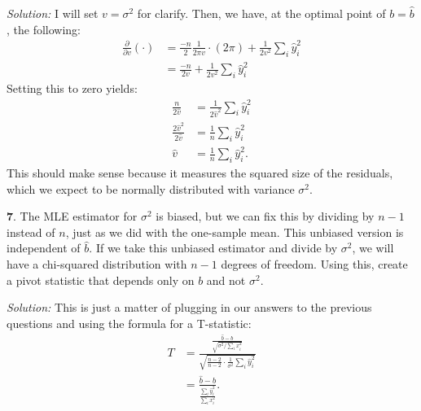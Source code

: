 \documentclass{tufte-handout}
\begin{document}
\textit{Solution:} I will set $v = \sigma^2$ for clarify. Then, we have, at the optimal point of
$b = \widehat{b}$, the following:
\begin{align*}
\frac{\partial}{\partial v} (\cdot) &= \frac{-n}{2} \frac{1}{2\pi v} \cdot (2\pi) + \frac{1}{2v^2} \sum_i \widehat{y}_i^2 \\
&= \frac{-n}{2v} + \frac{1}{2v^2} \sum_i \widehat{y}_i^2
\end{align*}
Setting this to zero yields:
\begin{align*}
\frac{n}{2\widehat{v}} &= \frac{1}{2\widehat{v}^2} \sum_i \widehat{y}_i^2 \\
\frac{2\widehat{v}^2}{2\widehat{v}} &= \frac{1}{n} \sum_i \widehat{y}_i^2 \\
\widehat{v} &= \frac{1}{n} \sum_i \widehat{y}_i^2.
\end{align*}
This should make sense because it measures the squared size of the residuals,
which we expect to be normally distributed with variance $\sigma^2$.

\textbf{7}. The MLE estimator for $\sigma^2$ is biased, but we can fix this by dividing by
$n-1$ instead of $n$, just as we did with the one-sample mean. This unbiased
version is independent of $\widehat{b}$. If we take this unbiased estimator and
divide by $\sigma^2$, we will have a chi-squared distribution with $n-1$ degrees
of freedom. Using this, create a pivot statistic that depends only on $b$ and not
$\sigma^2$.

\textit{Solution:} This is just a matter of plugging in our answers to the previous questions and
using the formula for a T-statistic:
\begin{align*}
T &= \frac{\frac{\widehat{b} - b}{\sqrt{\sigma^2 / \sum_i x_i^2}}}{
  \sqrt{ \frac{n-2}{n-2} \cdot \frac{1}{\sigma^2} \sum_i \widehat{y}_i^2 }
} \\
&=
\frac{\widehat{b} - b}{\frac{\sum_i \widehat{y}_i^2}{\sum_i x_i^2}}.
\end{align*}
\end{document}

